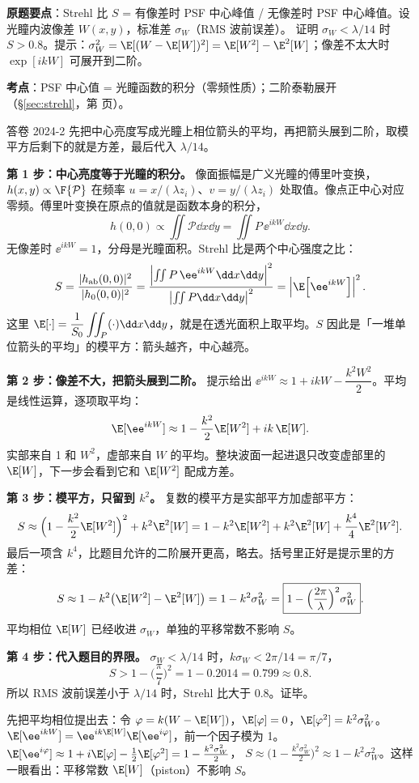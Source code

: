 \noindent\textbf{原题要点}：Strehl 比 $S$ = 有像差时 PSF 中心峰值 / 无像差时 PSF 中心峰值。设光瞳内波像差 $W(x,y)$，标准差 $\sigma_W$（RMS 波前误差）。
证明 $\sigma_W<\lambda/14$ 时 $S>0.8$。提示：$\sigma_W^2=\E[(W-\E[W])^2]=\E[W^2]-\E^2[W]$；像差不太大时 $\exp[ikW]$ 可展开到二阶。

\textbf{考点}：PSF 中心值 = 光瞳函数的积分（零频性质）；二阶泰勒展开（§\ref{sec:strehl}，第 \pageref{sec:strehl} 页）。

\begin{exam}{答卷 2024-2}
先把中心亮度写成光瞳上相位箭头的平均，再把箭头展到二阶，取模平方后剩下的就是方差，最后代入 $\lambda/14$。

\textbf{第 1 步：中心亮度等于光瞳的积分。}
像面振幅是广义光瞳的傅里叶变换，$h(x,y)\propto\F\{\mathcal P\}$ 在频率 $u=x/(\lambda z_i)$、$v=y/(\lambda z_i)$ 处取值。像点正中心对应零频。傅里叶变换在原点的值就是函数本身的积分，
\[
h(0,0)\propto\iint\mathcal P\dd x\dd y=\iint P\,\ee^{ikW}\dd x\dd y .
\]
无像差时 $\ee^{ikW}=1$，分母是光瞳面积。Strehl 比是两个中心强度之比：
\[
S=\frac{|h_{\text{ab}}(0,0)|^2}{|h_0(0,0)|^2}
=\frac{\left|\iint P\,\ee^{ikW}\dd x\dd y\right|^2}{\left|\iint P\dd x\dd y\right|^2}
=\left|\E\!\left[\ee^{ikW}\right]\right|^2 .
\]
这里 $\E[\cdot]=\dfrac1{S_0}\displaystyle\iint_P(\cdot)\dd x\dd y$，就是在透光面积上取平均。$S$ 因此是「一堆单位箭头的平均」的模平方：箭头越齐，中心越亮。

\textbf{第 2 步：像差不大，把箭头展到二阶。}
提示给出 $\ee^{ikW}\approx1+ikW-\dfrac{k^2W^2}{2}$。平均是线性运算，逐项取平均：
\[
\E[\ee^{ikW}]\approx1-\frac{k^2}{2}\E[W^2]+ik\,\E[W] .
\]
实部来自 1 和 $W^2$，虚部来自 $W$ 的平均。整块波面一起进退只改变虚部里的 $\E[W]$，下一步会看到它和 $\E[W^2]$ 配成方差。

\textbf{第 3 步：模平方，只留到 $k^2$。}
复数的模平方是实部平方加虚部平方：
\[
S\approx\Big(1-\frac{k^2}{2}\E[W^2]\Big)^2+k^2\E^2[W]
=1-k^2\E[W^2]+k^2\E^2[W]+\frac{k^4}{4}\E^2[W^2] .
\]
最后一项含 $k^4$，比题目允许的二阶展开更高，略去。括号里正好是提示里的方差：
\[
S\approx1-k^2\big(\E[W^2]-\E^2[W]\big)=1-k^2\sigma_W^2
=\boxed{1-\Big(\frac{2\pi}{\lambda}\Big)^2\sigma_W^2} .
\]
平均相位 $\E[W]$ 已经收进 $\sigma_W$，单独的平移常数不影响 $S$。

\textbf{第 4 步：代入题目的界限。}
$\sigma_W<\lambda/14$ 时，$k\sigma_W<2\pi/14=\pi/7$，
\[
S>1-\Big(\frac{\pi}{7}\Big)^2=1-0.2014=0.799\approx0.8 .
\]
所以 RMS 波前误差小于 $\lambda/14$ 时，Strehl 比大于 0.8。证毕。
\end{exam}

\begin{idea}
先把平均相位提出去：令 $\varphi=k(W-\E[W])$，$\E[\varphi]=0$，$\E[\varphi^2]=k^2\sigma_W^2$。
$\E[\ee^{ikW}]=\ee^{ik\E[W]}\E[\ee^{i\varphi}]$，前一个因子模为 1。
$\E[\ee^{i\varphi}]\approx1+i\E[\varphi]-\frac12\E[\varphi^2]=1-\frac{k^2\sigma_W^2}{2}$，
$S\approx\big(1-\frac{k^2\sigma_W^2}{2}\big)^2\approx1-k^2\sigma_W^2$。这样一眼看出：平移常数 $\E[W]$（piston）不影响 $S$。
\end{idea}

